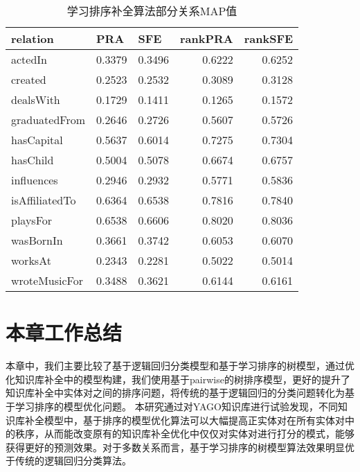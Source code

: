 \begin{table}[htbp]
  \centering
  \caption{学习排序补全算法部分关系MAP值}
    \begin{tabular}{|l|r|r|r|r|}
    \hline
    relation & \multicolumn{1}{l|}{PRA} & \multicolumn{1}{l|}{SFE} & \multicolumn{1}{l|}{rankPRA} & \multicolumn{1}{l|}{rankSFE} \\
    \hline
    actedIn & 0.3379  & 0.3496  & 0.6222  & 0.6252  \\
    \hline
    created & 0.2523  & 0.2532  & 0.3089  & 0.3128  \\
    \hline
    dealsWith & 0.1729  & 0.1411  & 0.1265  & 0.1572  \\
    \hline
    graduatedFrom & 0.2646  & 0.2726  & 0.5607  & 0.5726  \\
    \hline
    hasCapital & 0.5637  & 0.6014  & 0.7275  & 0.7304  \\
    \hline
    hasChild & 0.5004  & 0.5078  & 0.6674  & 0.6757  \\
    \hline
    influences & 0.2946  & 0.2932  & 0.5771  & 0.5836  \\
    \hline
    isAffiliatedTo & 0.6364  & 0.6538  & 0.7816  & 0.7840  \\
    \hline
    playsFor & 0.6538  & 0.6606  & 0.8020  & 0.8036  \\
    \hline
    wasBornIn & 0.3661  & 0.3742  & 0.6053  & 0.6070  \\
    \hline
    worksAt & 0.2343  & 0.2281  & 0.5022  & 0.5014  \\
    \hline
    wroteMusicFor & 0.3488  & 0.3621  & 0.6144  & 0.6161  \\
    \hline
    \end{tabular}%
  \label{rank}%
\end{table}%

\section{本章工作总结}
本章中，我们主要比较了基于逻辑回归分类模型和基于学习排序的树模型，通过优化知识库补全中的模型构建，我们使用基于pairwise的树排序模型，更好的提升了知识库补全中实体对之间的排序问题，将传统的基于逻辑回归的分类问题转化为基于学习排序的模型优化问题。
本研究通过对YAGO知识库进行试验发现，不同知识库补全模型中，基于排序的模型优化算法可以大幅提高正实体对在所有实体对中的秩序，从而能改变原有的知识库补全优化中仅仅对实体对进行打分的模式，能够获得更好的预测效果。对于多数关系而言，基于学习排序的树模型算法效果明显优于传统的逻辑回归分类算法。
